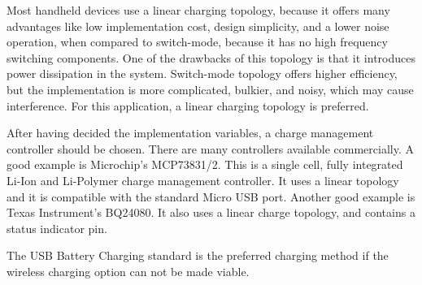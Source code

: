 Most handheld devices use a linear charging topology, because it offers many advantages like low implementation cost, design simplicity, and a lower noise operation, when compared to switch-mode, because it has no high frequency switching components. One of the drawbacks of this topology is that it introduces power dissipation in the system. Switch-mode topology offers higher efficiency, but the implementation is more complicated, bulkier, and noisy, which may cause interference. For this application, a linear charging topology is preferred.

After having decided the implementation variables, a charge management controller should be chosen. There are many controllers available commercially. A good example is Microchip's MCP73831/2. This is a single cell, fully integrated Li-Ion and Li-Polymer charge management controller. It uses a linear topology and it is compatible with the standard Micro USB port. Another good example is Texas Instrument's BQ24080. It also uses a linear charge topology, and contains a status indicator pin.

The USB Battery Charging standard is the preferred charging method if the wireless charging option can not be made viable.
